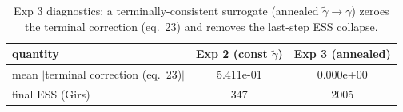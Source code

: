 \begin{table}[ht]
\centering
\caption{Exp 3 diagnostics: a terminally-consistent surrogate (annealed $\tilde\gamma\to\gamma$) zeroes the terminal correction (eq.~23) and removes the last-step ESS collapse.}
\label{tab:toy_3_diag}
\begin{tabular}{lcc}
\toprule
quantity & Exp 2 (const $\tilde\gamma$) & Exp 3 (annealed) \\
\midrule
mean $|$terminal correction (eq.~23)$|$ & 5.411e-01 & 0.000e+00 \\
final ESS (Girs) & 347 & 2005 \\
\bottomrule
\end{tabular}
\end{table}
